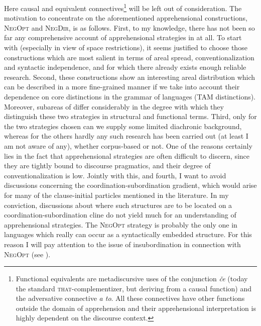 \documentclass[output=paper,colorlinks,citecolor=brown]{langscibook}
\begin{document}
Here causal and equivalent connectives\footnote{Functional equivalents are metadiscursive uses of the  conjunction \textit{če} (today the standard \textsc{that}-complementizer, but deriving from a causal function) and the  adversative connective \textit{a to}. All these connectives have other functions outside the domain of apprehension and their apprehensional interpretation is highly dependent on the discourse context.} will be left out of consideration. The motivation to concentrate on the aforementioned apprehensional constructions, \textsc{NegOpt} and \textsc{NegDir}, is as follows. First, to my knowledge, there has not been so far any comprehensive account of apprehensional strategies in  at all. To start with (especially in view of space restrictions), it seems justified to choose those constructions which are most salient in terms of areal spread, conventionalization and syntactic independence, and for which there already exists enough reliable research. Second, these constructions show an interesting areal distribution which can be described in a more fine-grained manner if we take into account their dependence on core distinctions in the grammar of  languages (TAM distinctions). Moreover, subareas of  differ considerably in the degree with which they distinguish these two strategies in structural and functional terms. Third, only for the two strategies chosen can we supply some limited diachronic background, whereas for the others hardly any such research has been carried out (at least I am not aware of any), whether corpus-based or not. One of the reasons certainly lies in the fact that apprehensional strategies are often difficult to discern, since they are tightly bound to discourse pragmatics, and their degree of conventionalization is low. Jointly with this, and fourth, I want to avoid discussions concerning the coordination-subordination gradient, which would arise for many of the clause-initial particles mentioned in the literature. In my conviction, discussions about where such structures are to be located on a coordination-subordination cline do not yield much for an understanding of apprehensional strategies. The \textsc{NegOpt} strategy is probably the only one in  languages which really can occur as a syntactically embedded structure. For this reason I will pay attention to the issue of insubordination in connection with \textsc{NegOpt} (see ).
\end{document}
